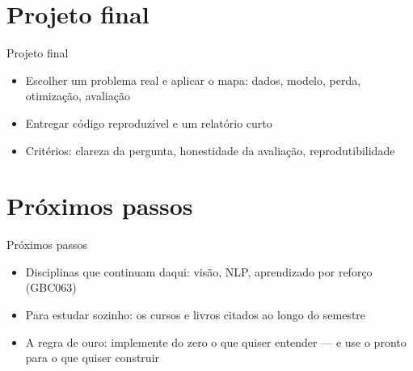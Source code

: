 \documentclass[aspectratio=169, 11pt]{beamer}
\begin{document}
\section{Projeto final}

\begin{frame}{Projeto final}
  \begin{itemize}\setlength{\itemsep}{0.4ex}
    \item Escolher um problema real e aplicar o mapa: dados, modelo, perda,
          otimização, avaliação
    \item Entregar código reproduzível e um relatório curto
    \item Critérios: clareza da pergunta, honestidade da avaliação,
          reprodutibilidade
  \end{itemize}
\end{frame}

\section{Próximos passos}

\begin{frame}{Próximos passos}
  \begin{itemize}\setlength{\itemsep}{0.4ex}
    \item Disciplinas que continuam daqui: visão, NLP, aprendizado por
          reforço (GBC063)
    \item Para estudar sozinho: os cursos e livros citados ao longo do
          semestre
    \item A regra de ouro: implemente do zero o que quiser entender —
          e use o pronto para o que quiser construir
  \end{itemize}
\end{frame}
\end{document}
